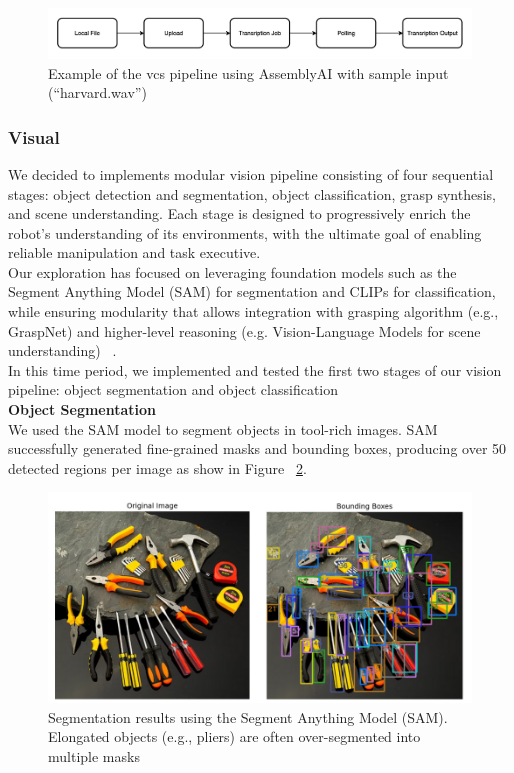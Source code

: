 \documentclass[12pt]{extarticle}
\begin{document}
\begin{figure}[H]
    \centering
    \includegraphics[width=\linewidth]{images/ASR_Pipeline.png}
    \caption{Example of the vcs pipeline using AssemblyAI with sample input (“harvard.wav”)}
    \label{fig: ASR_Pipeline.png}
\end{figure}

\subsubsection{Visual}
We decided to implements modular vision pipeline consisting of four sequential stages: object detection and segmentation, object classification, grasp synthesis, and scene understanding. Each stage is designed to progressively enrich the robot's understanding of its environments, with the ultimate goal of enabling reliable manipulation and task executive. \\

Our exploration has focused on leveraging foundation models such as the Segment Anything Model (SAM) for segmentation and CLIPs for classification, while ensuring modularity that allows integration with grasping algorithm (e.g., GraspNet) and higher-level reasoning (e.g. Vision-Language Models for scene understanding) ~\cite{segment-anything-2023,tlac-2025,hanwen2024_grasp,scene_seg}. \\

In this time period, we implemented and tested the first two stages of our vision pipeline: object segmentation and object classification \\


\textbf{Object Segmentation} \\


We used the SAM model to segment objects in tool-rich images. SAM successfully generated fine-grained masks and bounding boxes, producing over 50 detected regions per image as show in Figure ~\ref{fig: sam_pre}. 

\begin{figure}[H]
    \centering
    \includegraphics[width=\linewidth]{images/sam_pre.png}
    \caption{Segmentation results using the Segment Anything Model (SAM). 
    Elongated objects (e.g., pliers) are often over-segmented into multiple masks}
    \label{fig: sam_pre}
\end{figure}
\end{document}
